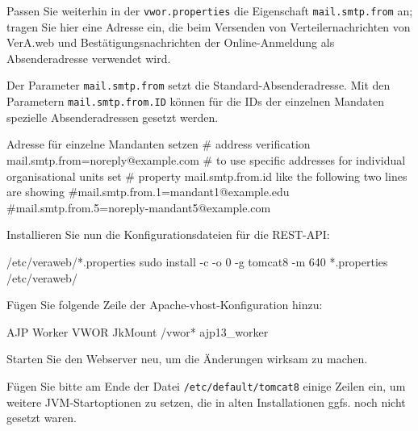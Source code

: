 \documentclass{tarentanleitung}
\newif\ifoa
\begin{document}
\begin{minipage}{\linewidth}
Passen Sie weiterhin in der \texttt{vwor.properties} die Eigenschaft
\texttt{mail.smtp.from} an; tragen Sie hier eine Adresse ein, die beim
Versenden von Verteilernachrichten von VerA.web und Bestätigungsnachrichten der Online-Anmeldung
als Absenderadresse verwendet wird.

Der Parameter \texttt{mail.smtp.from} setzt die Standard-Absenderadresse.
Mit den Parametern \texttt{mail.smtp.from.ID} können für die IDs der einzelnen
Mandaten spezielle Absenderadressen gesetzt werden.

\begin{lstdump}{Adresse für einzelne Mandanten setzen}
# address verification
mail.smtp.from=noreply@example.com
# to use specific addresses for individual organisational units set
# property mail.smtp.from.{id} like the following two lines are showing
#mail.smtp.from.1=mandant1@example.edu
#mail.smtp.from.5=noreply-mandant5@example.com
\end{lstdump}

\ifoa

Die \texttt{subject}- und
\texttt{content}-Parameter enthalten den Nachrichtenbetreff und
-inhalt; diese können Sie bei Bedarf anpassen; stellen Sie dabei
sicher, daß der Platzhalter \texttt{\$\{link\}} erhalten bleibt.

\fi%

\end{minipage}

\begin{minipage}{\linewidth}
Installieren Sie nun die Konfigurationsdateien für die REST-API:

\begin{lstdump}{/etc/veraweb/*.properties}
sudo install -c -o 0 -g tomcat8 -m 640 *.properties /etc/veraweb/
\end{lstdump}
\end{minipage}

\begin{minipage}{\linewidth}
Fügen Sie folgende Zeile der Apache-vhost-Konfiguration hinzu:

\begin{lstdump}{AJP Worker VWOR}
JkMount /vwor* ajp13_worker
\end{lstdump}
\end{minipage}

Starten Sie den Webserver neu, um die Änderungen wirksam zu machen.

Fügen Sie bitte am Ende der Datei \texttt{/etc/default/tomcat8}
einige Zeilen ein, um weitere JVM-Startoptionen zu setzen, die
in alten Installationen ggfs. noch nicht gesetzt waren.
\end{document}
